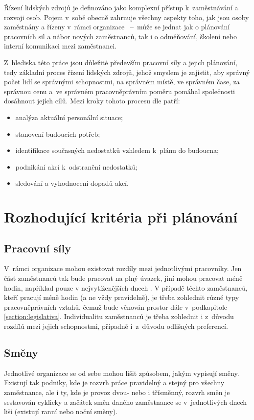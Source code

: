 \documentclass[twoside]{ctuthesis}
\begin{document}
Řízení lidských zdrojů je definováno jako komplexní přístup k~zaměstnávání a rozvoji osob. Pojem v~sobě obecně zahrnuje všechny aspekty toho, jak jsou osoby zaměstnány a řízeny v~rámci organizace \cite[s.~1]{armstrong2014}~--~může se jednat jak o plánování pracovních sil a nábor nových zaměstnanců, tak i o odměňování, školení nebo interní komunikaci mezi zaměstnanci. \cite[s.~37]{armstrong2014}

Z~hlediska této práce jsou důležité především pracovní síly a jejich plánování, tedy základní proces řízení lidských zdrojů, jehož smyslem je zajistit, aby správný počet lidí se správnými schopnostmi, na správném místě, ve správném čase, za správnou cenu a~ve správném pracovněprávním poměru pomáhal společnosti dosáhnout jejích cílů. Mezi kroky tohoto procesu dle \cite{cipd2020workforce} patří:
\begin{itemize}
	\item analýza aktuální personální situace;
	\item stanovení budoucích potřeb;
	\item identifikace současných nedostatků vzhledem k~plánu do budoucna;
	\item podnikání akcí k~odstranění nedostatků;
	\item sledování a vyhodnocení dopadů akcí.
\end{itemize}

\section{Rozhodující kritéria při plánování}

\subsection{Pracovní síly}
V~rámci organizace mohou existovat rozdíly mezi jednotlivými pracovníky. Jen část zaměstnanců tak bude pracovat na plný úvazek, jiní mohou pracovat méně hodin, například pouze v nejvytíženějších dnech \cite{lin2015}. V případě těchto zaměstnanců, kteří pracují méně hodin (a ne vždy pravidelně), je třeba zohlednit různé typy pracovněprávních vztahů, čemuž bude věnován prostor dále v~podkapitole \ref{section:legislativa}. Individualitu zaměstnanců je třeba zohlednit i z~důvodu rozdílů mezi jejich schopnostmi, případně i~z~důvodu odlišných preferencí.

\subsection{Směny}
\label{sub:smeny}
Jednotlivé organizace se od sebe mohou lišit způsobem, jakým vypisují směny. Existují tak podniky, kde je rozvrh práce pravidelný a stejný pro všechny zaměstnance, ale i ty, kde je provoz dvou- nebo i třísměnný, rozvrh směn je sestavován cyklicky a začátek směn daného zaměstnance se v~jed\-not\-li\-vý\-ch dnech liší (existují ranní nebo noční směny).
\end{document}
